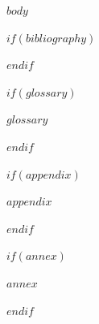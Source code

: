 \documentclass[
  12pt,
  oneside,
  a4paper,
  chapter=TITLE,
  english,
  portuguese
]{abntex2}
\begin{document}
\tableofcontents*
\cleardoublepage

\textual
\makeatletter
\let\@afterindentfalse\@afterindenttrue
\makeatother
\setcounter{secnumdepth}{3}
\setlength{\parindent}{1.3cm}

$body$

\postextual

$if(bibliography)$


$endif$

$if(glossary)$
\begin{glossario}
$glossary$
\end{glossario}
$endif$

$if(appendix)$
\begin{apendicesenv}
$appendix$
\end{apendicesenv}
$endif$

$if(annex)$
\begin{anexosenv}
$annex$
\end{anexosenv}
$endif$
\end{document}
